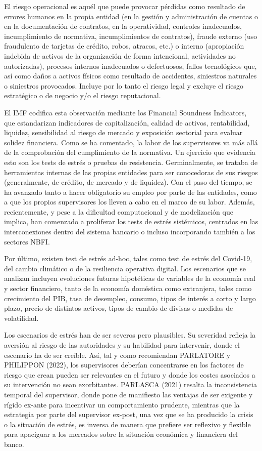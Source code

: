 \documentclass[10pt,a4paper]{article}
\begin{document}
El riesgo operacional es aquél que puede provocar pérdidas como resultado de errores humanos en la propia entidad (en la gestión y administración de cuentas o en la documentación de contratos, en la operatividad, controles inadecuados, incumplimiento de normativa, incumplimientos de contratos), fraude externo (uso fraudulento de tarjetas de crédito, robos, atracos, etc.) o interno (apropiación indebida de activos de la organización de forma intencional, actividades no autorizadas), procesos internos inadecuados o defectuosos, fallos tecnológicos que, así como daños a activos físicos como resultado de accidentes, siniestros naturales o siniestros provocados. Incluye por lo tanto el riesgo legal y excluye el riesgo estratégico o de negocio y/o el riesgo reputacional.


El IMF codifica esta observación mediante los Financial Soundness Indicators, que estandarizan indicadores de capitalización, calidad de activos, rentabilidad, liquidez, sensibilidad al riesgo de mercado y exposición sectorial para evaluar solidez financiera. Como se ha comentado, la labor de los supervisores va más allá de la comprobación del cumplimiento de la normativa. Un ejercicio que evidencia esto son los tests de estrés o pruebas de resistencia. Germinalmente, se trataba de herramientas internas de las propias entidades para ser conocedoras de sus riesgos (generalmente, de crédito, de mercado y de liquidez). Con el paso del tiempo, se ha avanzado tanto a hacer obligatorio su empleo por parte de las entidades, como a que los propios supervisores los lleven a cabo en el marco de su labor. Además, recientemente, y pese a la dificultad computacional y de modelización que implica, han comenzado a proliferar los tests de estrés sistémicos, centrados en las interconexiones dentro del sistema bancario o incluso incorporando también a los sectores NBFI. 

Por último, existen test de estrés ad-hoc, tales como test de estrés del Covid-19, del cambio climático o de la resiliencia operativa digital. Los escenarios que se analizan incluyen evoluciones futuras hipotéticas de variables de la economía real y sector financiero, tanto de la economía doméstica como extranjera, tales como crecimiento del PIB, tasa de desempleo, consumo, tipos de interés a corto y largo plazo, precio de distintos activos, tipos de cambio de divisas o medidas de volatilidad. 

Los escenarios de estrés han de ser severos pero plausibles. Su severidad refleja la aversión al riesgo de las autoridades y su habilidad para intervenir, donde el escenario ha de ser creíble. Así, tal y como recomiendan PARLATORE y PHILIPPON (2022), los supervisores deberían concentrarse en los factores de riesgo que crean pueden ser relevantes en el futuro y donde los costes asociados a su intervención no sean exorbitantes. PARLASCA (2021) resalta la inconsistencia temporal del supervisor, donde pone de manifiesto las ventajas de ser exigente y rígido ex-ante para incentivar un comportamiento prudente, mientras que la estrategia por parte del supervisor ex-post, una vez que se ha producido la crisis o la situación de estrés, es inversa de manera que prefiere ser reflexivo y flexible para apaciguar a los mercados sobre la situación económica y financiera del banco. 
\end{document}
